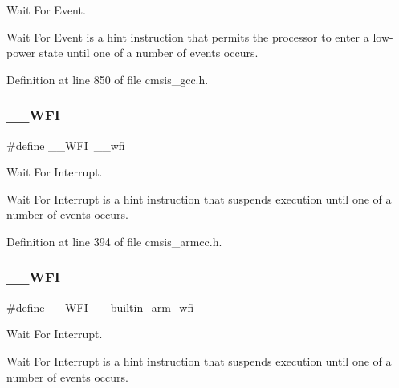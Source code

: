 Wait For Event. 

Wait For Event is a hint instruction that permits the processor to enter a low-\/power state until one of a number of events occurs. 

Definition at line 850 of file cmsis\+\_\+gcc.\+h.

\mbox{\label{group___c_m_s_i_s___core___instruction_interface_gad23bf2b78a9a4524157c9de0d30b7448}} 
\subsubsection{\texorpdfstring{\+\_\+\+\_\+\+W\+FI}{\_\_WFI}\hspace{0.1cm}{\footnotesize\ttfamily [1/3]}}
{\footnotesize\ttfamily \#define \+\_\+\+\_\+\+W\+FI~\+\_\+\+\_\+wfi}



Wait For Interrupt. 

Wait For Interrupt is a hint instruction that suspends execution until one of a number of events occurs. 

Definition at line 394 of file cmsis\+\_\+armcc.\+h.

\mbox{\label{group___c_m_s_i_s___core___instruction_interface_gad23bf2b78a9a4524157c9de0d30b7448}} 
\subsubsection{\texorpdfstring{\+\_\+\+\_\+\+W\+FI}{\_\_WFI}\hspace{0.1cm}{\footnotesize\ttfamily [2/3]}}
{\footnotesize\ttfamily \#define \+\_\+\+\_\+\+W\+FI~\+\_\+\+\_\+builtin\+\_\+arm\+\_\+wfi}



Wait For Interrupt. 

Wait For Interrupt is a hint instruction that suspends execution until one of a number of events occurs. 

